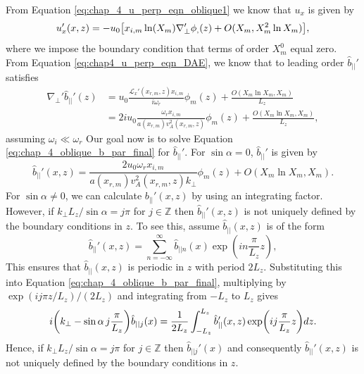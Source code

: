 From Equation \eqref{eq:chap_4_u_perp_eqn_oblique1} we know that $u_x$ is given by
\begin{equation}
    \label{eq:chap_4_oblique_ux_final}
    u_x'(x,z) = -u_0\qty[x_{i,m}\ln(X_m)\nabla_\perp'\phi_,(z) + O(X_m,X_m^2\ln X_m)],
\end{equation}
where we impose the boundary condition that terms of order $X_m^0$ equal zero.
From Equation \eqref{eq:chap4_u_perp_eqn_DAE}, we know that to leading order $\hat{b}_{||}'$ satisfies
\begin{equation}
    \label{eq:chap_4_oblique_b_par_final}
    \begin{aligned}
   \nabla_\perp' \hat{b}_{||}'(z) &= u_0\frac{\mathcal{L}_x'(x_{r,m},z)x_{i,m}}{i\omega_r}\phi_m(z) + \frac{O(X_m\ln X_m, X_m)}{L_z} \\
   &= 2iu_0\frac{\omega_r x_{i,m}}{a(x_{r,m})v_A^2(x_{r,m},z)}\phi_m(z) + \frac{O(X_m\ln X_m, X_m)}{L_z},
   \end{aligned}
\end{equation}
assuming $\omega_i\ll\omega_r$
Our goal now is to solve Equation \eqref{eq:chap_4_oblique_b_par_final} for $\hat{b}_{||}'$. For $\sin\alpha=0$, $\hat{b}_{||}'$ is given by
\begin{equation}
    \hat{b}_{||}'(x,z) = \frac{2u_0\omega_r x_{i,m}}{a(x_{r,m})v_A^2(x_{r,m},z)k_\perp}\phi_m(z) + O(X_m\ln X_m, X_m).
\end{equation}
For $\sin\alpha\ne0$, we can calculate $b_{||}'(x,z)$ by using an integrating factor. However, if $k_\perp L_z / \sin\alpha = j\pi$ for $j\in\mathds{Z}$ then $\hat{b}_{||}'(x,z)$ is not uniquely defined by the boundary conditions in $z$. To see this, assume $\hat{b}_{||}(x,z)$ is of the form
\[\hat{b}_{||}'(x,z) = \sum_{n=-\infty}^\infty \hat{b}_{||n}(x)\exp(in\frac{\pi}{L_z}z),\]
This ensures that $\hat{b}_{||}(x,z)$ is periodic in $z$ with period $2L_z$. Substituting this into Equation \eqref{eq:chap_4_oblique_b_par_final}, multiplying by 
$\exp(ij\pi z / L_z) / (2 L_z)$ and integrating from $-L_z$ to $L_z$ gives
\[i\qty(k_\perp - \sin\alpha\, j\frac{\pi}{L_z})\hat{b}_{|| j}(x) = \frac{1}{2L_z}\int_{-L_z}^{L_z}\hat{b}_{||}'(x,z)\exp(ij\frac{\pi}{L_z}z)dz.\]
Hence, if $k_\perp L_z / \sin\alpha = j\pi$ for $j\in\mathds{Z}$ then $\hat{b}_{||j}'(x)$ and consequently $\hat{b}_{||}'(x,z)$ is not uniquely defined by the boundary conditions in $z$. 

